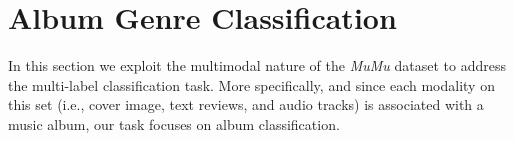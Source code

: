 


\section{Album Genre Classification}\label{sec:multi-class:classification}

In this section we exploit the multimodal nature of the \emph{MuMu} dataset to address the multi-label classification task.
More specifically, and since each modality on this set (i.e., cover image, text reviews, and audio tracks) is associated with a music album, our task focuses on album classification. %



